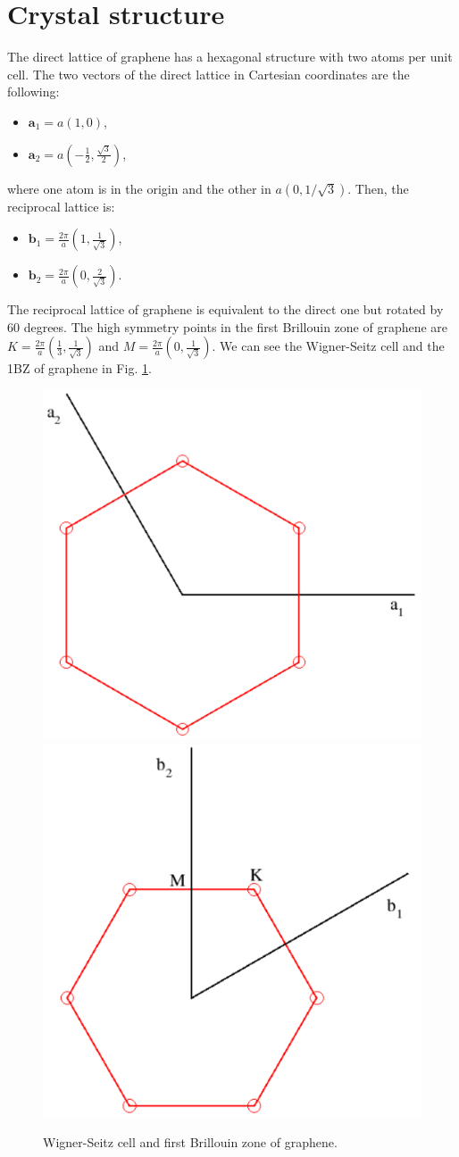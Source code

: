 \section{Crystal structure}

The direct lattice of graphene has a hexagonal structure with two atoms per unit cell. The two vectors of the direct 
lattice in Cartesian coordinates are the following:
\begin{itemize}
 \item $\mathbf{a}_{1}=a(1,0)$,
 \item $\mathbf{a}_{2}=a\left(-\frac{1}{2},\frac{\sqrt{3}}{2}\right)$,
\end{itemize}
where one atom is in the origin and the other in $a(0,1/\sqrt{3})$. Then, the reciprocal lattice is:
\begin{itemize}
 \item $\mathbf{b}_{1}=\frac{2\pi}{a}\left(1,\frac{1}{\sqrt{3}}\right)$,
 \item $\mathbf{b}_{2}=\frac{2\pi}{a}\left(0,\frac{2}{\sqrt{3}}\right)$.
\end{itemize}
The reciprocal lattice of graphene is equivalent to the direct one but rotated by $60$ degrees. The high symmetry 
points in the first Brillouin zone of graphene are $K=\frac{2\pi}{a}\left(\frac{1}{3},\frac{1}{\sqrt{3}}\right)$ and 
$M=\frac{2\pi}{a}\left(0,\frac{1}{\sqrt{3}}\right)$. We can see the Wigner-Seitz cell and the 1BZ of graphene in 
Fig. \ref{wigner}.
\begin{figure}[htb]
\includegraphics[width=0.45\linewidth]{Figures/ws.pdf}
\includegraphics[width=0.45\linewidth]{Figures/brillouin.pdf}
\caption{Wigner-Seitz cell and first Brillouin zone of graphene.}
\label{wigner}
\end{figure}

